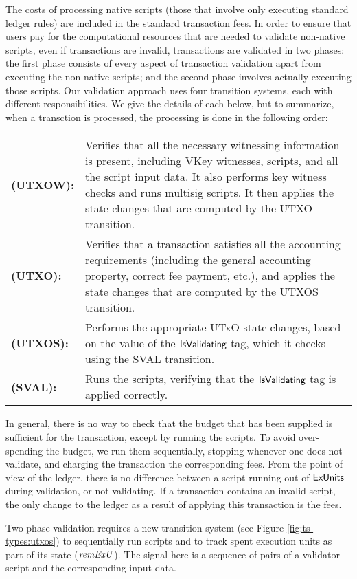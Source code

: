 The costs of processing native scripts (those that involve only executing standard ledger rules) are included in the standard transaction fees.
In order to ensure that users pay for the computational resources that are needed to validate non-native scripts, even
if transactions are invalid, transactions are validated in two phases:
the first phase consists of every aspect of transaction validation apart from executing the non-native scripts; and
the second phase involves actually executing those scripts.
%
Our validation approach  uses four transition systems, each with different responsibilities. We
give the details of each below, but to summarize, when a transction is processed,
the processing is done
in the following order:


\begin{tabular}{lp{12cm}}
  \textbf{(UTXOW):} & Verifies that all the necessary witnessing information is present, including
  VKey witnesses, scripts, and all the script input data. It also performs
  key witness checks and runs multisig scripts. It then applies the state changes that are
  computed by the UTXO transition.
  \\
  \textbf{(UTXO):} & Verifies that a transaction satisfies all the accounting requirements
  (including the general accounting property, correct fee payment, etc.),
  and applies the state changes that are computed by the UTXOS transition.
  \\
  \textbf{(UTXOS):} & Performs the appropriate UTxO state changes, based on the
  value of the $\mathsf{IsValidating}$ tag, which it checks using the SVAL transition.
  \\
  \textbf{(SVAL):} & Runs the scripts, verifying that the $\mathsf{IsValidating}$ tag
  is applied correctly.
\end{tabular}

In general, there is no way to check that the budget that has been supplied is sufficient for the transaction,
except by running the scripts. To avoid over-spending the budget, we run them sequentially,
stopping whenever one does not validate, and charging the transaction the corresponding
fees. From the point of view of the ledger, there is no difference
between a script running out of $\mathsf{ExUnits}$ during validation, or not validating.
If a transaction contains an invalid script, the only change to the ledger
as a result of applying this transaction is the fees.

Two-phase validation requires a new transition system
(see Figure \ref{fig:ts-types:utxos}) to sequentially run
scripts and to track spent execution units as part of its state
($\mathit{remExU}$). The signal here is a sequence of pairs of a validator
script and the corresponding input data.

